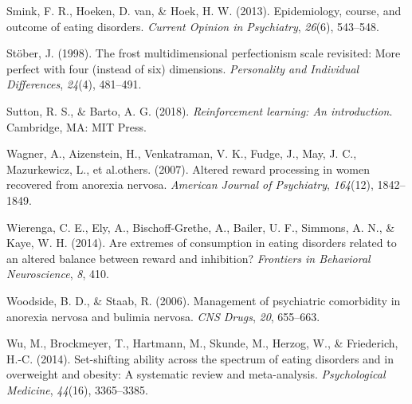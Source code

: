\documentclass[
  man,floatsintext]{apa6}
\newlength{\cslhangindent}
\newlength{\cslentryspacingunit} %
\newenvironment{CSLReferences}[2] %
 {%
  \setlength{\parindent}{0pt}
  \ifodd #1
  \let\oldpar\par
  \def\par{\hangindent=\cslhangindent\oldpar}
  \fi
  \setlength{\parskip}{#2\cslentryspacingunit}
 }%
 {}
\begin{document}
\begin{CSLReferences}{1}{0}
\leavevmode{}%
Smink, F. R., Hoeken, D. van, \& Hoek, H. W. (2013). Epidemiology, course, and outcome of eating disorders. \emph{Current Opinion in Psychiatry}, \emph{26}(6), 543--548.

\leavevmode{}%
Stöber, J. (1998). The frost multidimensional perfectionism scale revisited: More perfect with four (instead of six) dimensions. \emph{Personality and Individual Differences}, \emph{24}(4), 481--491.

\leavevmode{}%
Sutton, R. S., \& Barto, A. G. (2018). \emph{Reinforcement learning: An introduction}. Cambridge, MA: MIT Press.

\leavevmode{}%
Wagner, A., Aizenstein, H., Venkatraman, V. K., Fudge, J., May, J. C., Mazurkewicz, L., et al.others. (2007). Altered reward processing in women recovered from anorexia nervosa. \emph{American Journal of Psychiatry}, \emph{164}(12), 1842--1849.

\leavevmode{}%
Wierenga, C. E., Ely, A., Bischoff-Grethe, A., Bailer, U. F., Simmons, A. N., \& Kaye, W. H. (2014). Are extremes of consumption in eating disorders related to an altered balance between reward and inhibition? \emph{Frontiers in Behavioral Neuroscience}, \emph{8}, 410.

\leavevmode{}%
Woodside, B. D., \& Staab, R. (2006). Management of psychiatric comorbidity in anorexia nervosa and bulimia nervosa. \emph{CNS Drugs}, \emph{20}, 655--663.

\leavevmode{}%
Wu, M., Brockmeyer, T., Hartmann, M., Skunde, M., Herzog, W., \& Friederich, H.-C. (2014). Set-shifting ability across the spectrum of eating disorders and in overweight and obesity: A systematic review and meta-analysis. \emph{Psychological Medicine}, \emph{44}(16), 3365--3385.

\end{CSLReferences}
\end{document}

